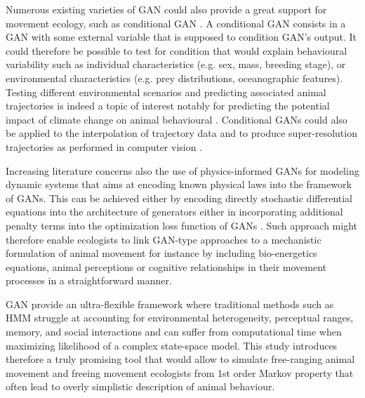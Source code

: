 \documentclass{article}
\begin{document}
Numerous existing varieties of GAN could also provide a great support for movement ecology, such as conditional GAN \citep{isola_image--image_2018}. A conditional GAN consists in a GAN with some external variable that is supposed to condition GAN's output. It could therefore be possible to test for condition that would explain behavioural variability such as individual characteristics (e.g. sex, mass, breeding stage), or environmental characteristics (e.g. prey distributions, oceanographic features). Testing different environmental scenarios and predicting associated animal trajectories is indeed a topic of interest notably for predicting the potential impact of climate change on animal behavioural \citep{huckstadt_projected_2020}. Conditional GANs could also be applied to the interpolation of trajectory data and to produce super-resolution trajectories as performed in computer vision \citep{ledig_photo-realistic_2017}.

Increasing literature concerns also the use of physics-informed GANs for modeling dynamic systems that aims at encoding known physical laws
into the framework of GANs. This can be achieved either by encoding directly stochastic differential equations into the architecture of generators  \citep{yang_physics-informed_2018} either in incorporating additional penalty terms into the optimization loss function of GANs \citep{bode_using_2019,wu_enforcing_2020}. Such approach might therefore enable ecologists to link GAN-type approaches to a mechanistic formulation of animal movement for instance by including bio-energetics equations, animal perceptions or cognitive relationships in their movement processes in a straightforward manner.

GAN provide an ultra-flexible framework where traditional methods such as HMM struggle at accounting for environmental heterogeneity, perceptual ranges, memory, and social interactions and can suffer from computational time when maximizing likelihood of a complex state-space model. This study introduces therefore a truly promising tool that would allow to simulate free-ranging animal movement and freeing movement ecologists from 1st order Markov property that often lead to overly simplistic description of animal behaviour.
\end{document}
